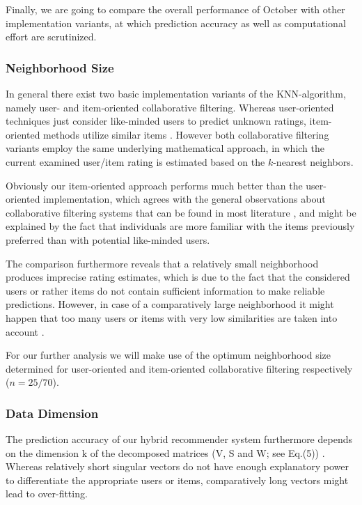 \documentclass[11pt,letterpaper]{article}
\begin{document}
Finally, we are going to compare the overall performance of October with other implementation variants, at which prediction accuracy as well as computational effort are scrutinized.

\subsubsection{Neighborhood Size}

In general there exist two basic implementation variants of the KNN-algorithm, namely user- and item-oriented collaborative filtering. Whereas user-oriented techniques just consider like-minded users to predict unknown ratings, item-oriented methods utilize similar items \cite{10,13}. However both collaborative filtering variants employ the same underlying mathematical approach, in which the current examined user/item rating is estimated based on the $k$-nearest neighbors.

Obviously our item-oriented approach performs much better than the user-oriented implementation, which agrees with the general observations about collaborative filtering systems that can be found in most literature \cite{8, 2}, and might be explained by the fact that individuals are more familiar with the items previously preferred than with potential like-minded users. 

The comparison furthermore reveals that a relatively small neighborhood produces imprecise rating estimates, which is due to the fact that the considered users or rather items do not contain sufficient information to make reliable predictions. However, in case of a comparatively large neighborhood it might happen that too many users or items with very low similarities are taken into account \cite{4, 6}. 

For our further analysis we will make use of the optimum neighborhood size determined for user-oriented and item-oriented collaborative filtering respectively ($n = 25/70$).

\subsubsection{Data Dimension}

The prediction accuracy of our hybrid recommender system furthermore depends on the dimension k of the decomposed matrices (V, S and W; see Eq.(5)) \cite{10, 4}. Whereas relatively short singular vectors do not have enough explanatory power to differentiate the appropriate users or items, comparatively long vectors might lead to over-fitting.\\
\end{document}
